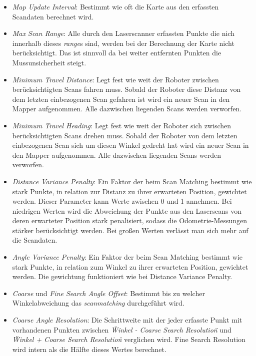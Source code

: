 \begin{itemize}
\item \emph{Map Update Interval}: Bestimmt wie oft die Karte aus den erfassten Scandaten berechnet wird.

\item \emph{Max Scan Range}: Alle durch den Laserscanner erfassten Punkte die nich innerhalb dieses \emph{range}s sind, werden bei der Berechnung der Karte nicht berücksichtigt. Das ist sinnvoll da bei weiter entfernten Punkten die Mussunsicherheit steigt.

\item \emph{Minimum Travel Distance}: Legt fest wie weit der Roboter zwischen berücksichtigten Scans fahren muss. Sobald der Roboter diese Distanz von dem letzten einbezogenen Scan gefahren ist wird ein neuer Scan in den Mapper aufgenommen. Alle dazwischen liegenden Scans werden verworfen.

\item \emph{Minimum Travel Heading}: Legt fest wie weit der Roboter sich zwischen berücksichtigten Scans drehen muss. Sobald der Roboter von dem letzten einbezogenen Scan sich um diesen Winkel gedreht hat wird ein neuer Scan in den Mapper aufgenommen. Alle dazwischen liegenden Scans werden verworfen.

\item \emph{Distance Variance Penalty}: Ein Faktor der beim Scan Matching bestimmt wie stark Punkte, in relation zur Distanz zu ihrer erwarteten Position, gewichtet werden. Dieser Parameter kann Werte zwischen 0 und 1 annehmen. Bei niedrigen Werten wird die Abweichung der Punkte aus den Laserscans von deren erwarteter Position stark penalisiert, sodass die Odometrie-Messungen stärker berücksichtigt werden. Bei großen Werten verlässt man sich mehr auf die Scandaten.

\item \emph{Angle Variance Penalty}: Ein Faktor der beim Scan Matching bestimmt wie stark Punkte, in relation zum Winkel zu ihrer erwarteten Position, gewichtet werden. Die gewichtung funktioniert wie bei Distance Variance Penalty.

\item \emph{Coarse} und \emph{Fine Search Angle Offset}: Bestimmt bis zu welcher Winkelabweichung das \emph{scanmatching} durchgeführt wird.

\item \emph{Coarse Angle Resolution}: Die Schrittweite mit der jeder erfasste Punkt mit vorhandenen Punkten zwischen \emph{\"Winkel - Coarse Search Resolution\"} und \emph{\"Winkel + Coarse Search Resolution\"} verglichen wird. Fine Search Resolution wird intern als die Hälfte dieses Wertes berechnet.


\end{itemize}
